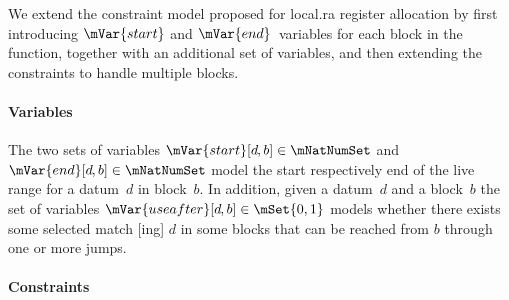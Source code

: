 We extend the \gls{constraint model} proposed for \gls{local.ra} \gls{register
  allocation} by first introducing $\mVar{start}$ and
$\mVar{end}$~\glspl{variable} for each \gls{block} in the \gls{function},
together with an additional set of \glspl{variable}, and then extending the
\glspl{constraint} to handle multiple \glspl{block}.


\paragraph{Variables}

The two sets of \glspl{variable} \mbox{$\mVar{start}[d \hspace{-.8pt}, b] \in
  \mNatNumSet$} and \mbox{$\mVar{end}[d \hspace{-.8pt}, b] \in \mNatNumSet$}
model the start respectively end of the \gls{live range} for a \gls{datum}~$d$
in \gls{block}~$b$\hspace{-.8pt}.
%
In addition, given a \gls{datum}~$d$ and a \gls{block}~$b$ the set of
\glspl{variable} \mbox{$\mVar{useafter}[d \hspace{-.8pt}, b] \in \mSet{0, 1}$}
models whether there exists some selected \gls{match} [ing] $d$
in some \glspl{block} that can be reached from $b$ through one or more jumps.


\paragraph{Constraints}

